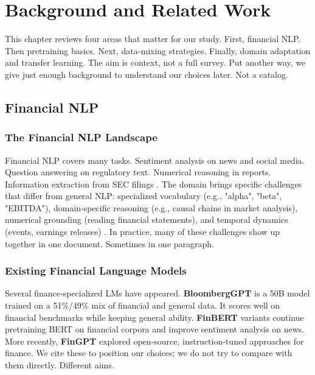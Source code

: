 \chapter{Background and Related Work}

This chapter reviews four areas that matter for our study. First, financial NLP. Then pretraining basics. Next, data-mixing strategies. Finally, domain adaptation and transfer learning. The aim is context, not a full survey. Put another way, we give just enough background to understand our choices later. Not a catalog.

\section{Financial NLP}

\subsection{The Financial NLP Landscape}

Financial NLP covers many tasks. Sentiment analysis on news and social media. Question answering on regulatory text. Numerical reasoning in reports. Information extraction from SEC filings \parencite{araci2019finbert, chen2021finqa}. The domain brings specific challenges that differ from general NLP: specialized vocabulary (e.g., "alpha", "beta", "EBITDA"), domain‑specific reasoning (e.g., causal chains in market analysis), numerical grounding (reading financial statements), and temporal dynamics (events, earnings releases) \parencite{wu2023bloomberggpt, araci2019finbert}. In practice, many of these challenges show up together in one document. Sometimes in one paragraph.

\subsection{Existing Financial Language Models}

Several finance‑specialized LMs have appeared. \textbf{BloombergGPT} \parencite{wu2023bloomberggpt} is a 50B model trained on a 51\%/49\% mix of financial and general data. It scores well on financial benchmarks while keeping general ability. \textbf{FinBERT} variants \parencite{araci2019finbert, yang2020finbert} continue pretraining BERT on financial corpora and improve sentiment analysis on news. More recently, \textbf{FinGPT} \parencite{yang2023fingpt} explored open‑source, instruction‑tuned approaches for finance. We cite these to position our choices; we do not try to compare with them directly. Different aims.

